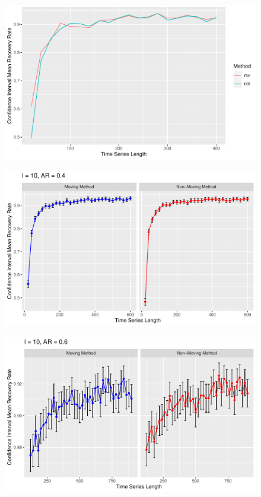 \documentclass[12pt, letterpaper, titlepage]{article}
\begin{document}
\begin{figure}[tbp]
  \centering
  \includegraphics[width=\textwidth]{constant_0.2}
  \caption{}
  \label{fig:constant_0.2}
\end{figure}

\begin{figure}[tbp]
  \centering
  \includegraphics[width=\textwidth]{constant_0.4}
  \caption{}
  \label{fig:constant_0.4}
\end{figure}

\begin{figure}[tbp]
  \centering
  \includegraphics[width=\textwidth]{constant_0.6}
  \caption{}
  \label{fig:constant_0.6}
\end{figure}
\end{document}
